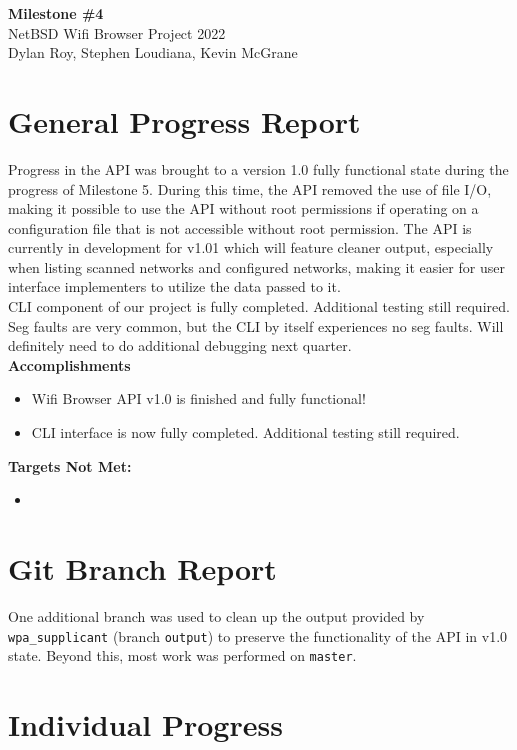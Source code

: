 \documentclass[11pt]{article}
\begin{document}
\begin{center}
  \textbf{\Large Milestone \#4}\\\large NetBSD Wifi Browser Project 2022\\
  Dylan Roy, Stephen Loudiana, Kevin McGrane
\end{center}


\section{General Progress Report}
Progress in the API was brought to a version 1.0 fully functional state during
the progress of Milestone 5. During this time, the API removed the use of file
I/O, making it possible to use the API without root permissions if operating on
a configuration file that is not accessible without root permission. The API is
currently in development for v1.01 which will feature cleaner output, especially
when listing scanned networks and configured networks, making it easier for user
interface implementers to utilize the data passed to it.\\
CLI component of our project is fully completed. Additional testing still 
required. Seg faults are very common, but the CLI by itself experiences no seg 
faults. Will definitely need to do additional debugging next quarter. \\

\textbf{Accomplishments}
\begin{itemize}
  \item Wifi Browser API v1.0 is finished and fully functional!
  \item CLI interface is now fully completed. Additional testing still required. 
\end{itemize}

\textbf{Targets Not Met:}
\begin{itemize}
  \item
\end{itemize}


\section{Git Branch Report}
One additional branch was used to clean up the output provided by \texttt{wpa\_supplicant}
(branch \texttt{output}) to preserve the functionality of the API in v1.0 state.
Beyond this, most work was performed on \texttt{master}.

\section{Individual Progress}
\end{document}
